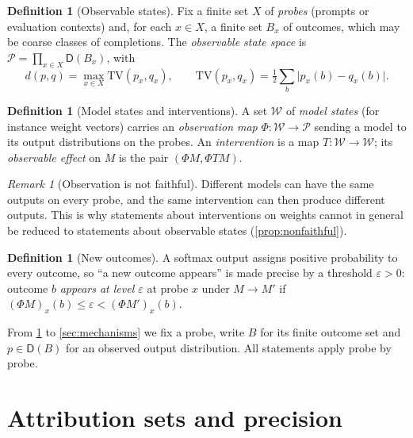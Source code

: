 \documentclass[11pt]{article}
\theoremstyle{definition}
\newtheorem{definition}[theorem]{Definition}
\theoremstyle{remark}
\newtheorem{remark}[theorem]{Remark}
\newcommand{\D}{\mathsf{D}}
\newcommand{\TV}{\mathrm{TV}}
\newcommand{\cP}{\mathcal{P}}
\newcommand{\cW}{\mathcal{W}}
\begin{document}
\begin{definition}[Observable states]\label{def:obs}
Fix a finite set $X$ of \emph{probes} (prompts or evaluation contexts) and, for each $x\in X$, a
finite set $B_x$ of outcomes, which may be coarse classes of completions. The \emph{observable state
space} is $\cP=\prod_{x\in X}\D(B_x)$, with
\[
d(p,q)=\max_{x\in X}\TV(p_x,q_x),\qquad \TV(p_x,q_x)=\tfrac12\textstyle\sum_b\lvert p_x(b)-q_x(b)\rvert .
\]
\end{definition}

\begin{definition}[Model states and interventions]
A set $\cW$ of \emph{model states} (for instance weight vectors) carries an \emph{observation map}
$\Phi\colon\cW\to\cP$ sending a model to its output distributions on the probes. An
\emph{intervention} is a map $T\colon\cW\to\cW$; its \emph{observable effect} on $M$ is the pair
$(\Phi M,\Phi TM)$.
\end{definition}

\begin{remark}[Observation is not faithful]
Different models can have the same outputs on every probe, and the same intervention can then
produce different outputs. This is why statements about interventions on weights cannot in general be
reduced to statements about observable states (\cref{prop:nonfaithful}).
\end{remark}

\begin{definition}[New outcomes]
A softmax output assigns positive probability to every outcome, so ``a new outcome appears'' is made
precise by a threshold $\varepsilon>0$: outcome $b$ \emph{appears at level $\varepsilon$} at probe
$x$ under $M\to M'$ if $(\Phi M)_x(b)\le\varepsilon<(\Phi M')_x(b)$.
\end{definition}

From \cref{sec:attribution} to \cref{sec:mechanisms} we fix a probe, write $B$ for its finite outcome
set and $p\in\D(B)$ for an observed output distribution. All statements apply probe by probe.

\section{Attribution sets and precision}\label{sec:attribution}
\end{document}
